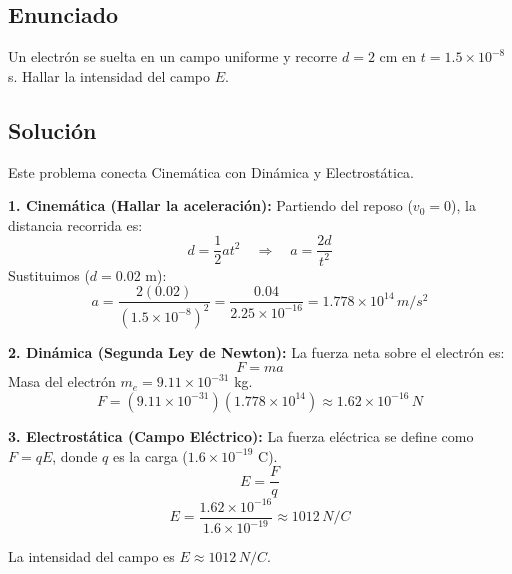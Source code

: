 \documentclass[12pt, a4paper]{article}
\begin{document}
\newpage

\subsection*{Enunciado}
Un electrón se suelta en un campo uniforme y recorre $d=2$ cm en $t=1.5 \times 10^{-8}$ s. Hallar la intensidad del campo $E$.

\subsection*{Solución}

Este problema conecta Cinemática con Dinámica y Electrostática.

\textbf{1. Cinemática (Hallar la aceleración):}
Partiendo del reposo ($v_0 = 0$), la distancia recorrida es:
$$ d = \frac{1}{2} a t^2 \quad \Rightarrow \quad a = \frac{2d}{t^2} $$
Sustituimos ($d=0.02$ m):
$$ a = \frac{2(0.02)}{(1.5 \times 10^{-8})^2} = \frac{0.04}{2.25 \times 10^{-16}} = 1.778 \times 10^{14} \, \si{m/s^2} $$

\textbf{2. Dinámica (Segunda Ley de Newton):}
La fuerza neta sobre el electrón es:
$$ F = m a $$
Masa del electrón $m_e = 9.11 \times 10^{-31}$ kg.
$$ F = (9.11 \times 10^{-31}) (1.778 \times 10^{14}) \approx 1.62 \times 10^{-16} \, \si{N} $$

\textbf{3. Electrostática (Campo Eléctrico):}
La fuerza eléctrica se define como $F = qE$, donde $q$ es la carga ($1.6 \times 10^{-19}$ C).
$$ E = \frac{F}{q} $$
$$ E = \frac{1.62 \times 10^{-16}}{1.6 \times 10^{-19}} \approx 1012 \, \si{N/C} $$

\begin{tcolorbox}[colback=green!5!white,title=Respuesta]
La intensidad del campo es $E \approx 1012 \, \si{N/C}$.
\end{tcolorbox}
\end{document}
